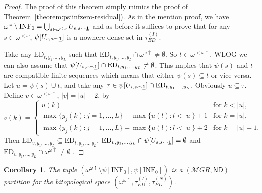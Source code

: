 \documentclass[12pt]{amsart}
\theoremstyle{plain}
\newtheorem{corollary}[theorem]{Corollary}
\theoremstyle{definition}
\theoremstyle{remark}
\newcommand{\baire}{\omega^{\omega}}
\newcommand{\finbaire}{\omega^{<\omega}}
\newcommand{\finincrbaire}{\omega^{< \omega \uparrow}}
\newcommand{\incrbaire}{\omega^{\omega \uparrow}}
\newcommand{\meager}{{\mathcal MGR}}
\newcommand{\ND}{\mathsf{ND}}
\newcommand{\Hechler}[2]{U_{#1,#2}}
\newcommand{\EventuallyDifferent}[2]{\mathrm{ED}_{#1,#2}}
\newcommand{\EventuallyDifferentNative}{\tau_{\mathit{ED}}^{(N)}}
\newcommand{\EventuallyDifferentInduced}{\tau_{\mathit{ED}}^{(I)}}
\newcommand{\INFZero}{\mathrm{INF}_0}
\newcommand{\sequenceOnes}{\underline{\bf 1}}
\begin{document}
\begin{proof}
  The proof of this theorem simply mimics the proof of
  Theorem~\ref{theorem:psiinfzero-residual}).
As in the mention proof, we have
$\baire\setminus\INFZero = \bigcup_{s \in \finbaire} \Hechler{s}{s \frown \sequenceOnes}$
and as before it suffices to prove that for any ${s \in \finbaire}$,
$\psi[\Hechler{s}{s \frown \sequenceOnes}]$ is a nowhere dense set in $\EventuallyDifferentInduced$.

Take any $\EventuallyDifferent{t}{y_1, \ldots, y_L}$ such that
$\EventuallyDifferent{t}{y_1,\ldots,y_L} \cap \incrbaire\not=\emptyset$.
So $t \in \finincrbaire$. WLOG we can also assume that
$\psi[\Hechler{s}{s \frown \sequenceOnes}] \cap \EventuallyDifferent{t}{y_1,\ldots,y_L} \not= \emptyset$.
This implies that $\psi(s)$ and $t$ are compatible finite sequences
which means that either $\psi(s) \subseteq t$ or vice versa.
 Let $u = \psi(s) \cup t$, and take any
 $\tau \in \psi[\Hechler{s}{s \frown \sequenceOnes}] \cap \EventuallyDifferent{t}{y_1,\ldots,y_L}$.
 Obviously $u \subseteq \tau$.
 Define
  $v \in \finincrbaire$, $|v| = |u| + 2$,
by 
\[
  v(k) = \begin{cases}
    u(k) & \text{for } k < |u|,\\
    \max \lbrace y_j(k) \colon j = 1,\ldots, L\rbrace + \max \lbrace u(l) \colon
      l < |u| \rbrace + 1 & \text{for } k = |u|,\\
    \max \lbrace y_j(k) \colon j = 1,\ldots, L\rbrace + \max \lbrace u(l) \colon
      l < |u| \rbrace +
    2 & \text{for } k = |u| + 1.
    \end{cases}
\]
Then $\EventuallyDifferent{v}{y_1,\ldots,y_L} \subseteq \EventuallyDifferent{t}{y_1,\ldots,y_L}$,
$\EventuallyDifferent{v}{y_1,\ldots,y_L} \cap \psi[\Hechler{s}{s \frown \sequenceOnes}] = \emptyset$
and
$\EventuallyDifferent{v}{y_1,\ldots,y_L} \cap \incrbaire \not= \emptyset$
.
\end{proof}

\begin{corollary}
  The tuple $(\incrbaire\setminus \psi[\INFZero], \psi[\INFZero])$
is a $(\meager, \ND)$ partition for the bitopological space
$(\incrbaire, \EventuallyDifferentInduced, \EventuallyDifferentNative)$.
\end{corollary}
\end{document}
